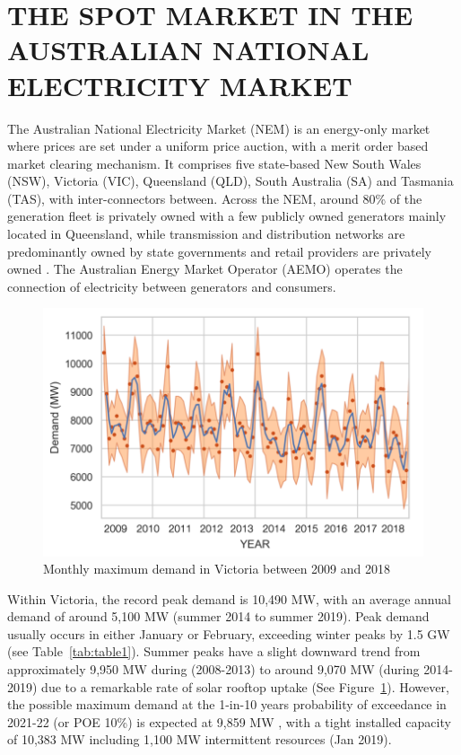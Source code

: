 \documentclass{pasa}%
\begin{document}
\section{THE SPOT MARKET IN THE AUSTRALIAN NATIONAL ELECTRICITY MARKET}
\label{sec:NEM}

The Australian National Electricity Market (NEM) is an energy-only market where prices are set under a uniform price auction, with a merit order based market clearing mechanism. It comprises five state-based New South Wales (NSW), Victoria (VIC), Queensland (QLD), South Australia (SA) and Tasmania (TAS), with inter-connectors between. Across the NEM, around 80\% of the generation fleet is privately owned with a few publicly owned generators mainly located in Queensland, while transmission and distribution networks are predominantly owned by state governments and retail providers are privately owned \cite{aer2019}. The Australian Energy Market Operator (AEMO) operates the connection of electricity between generators and consumers. 

\begin{figure}
\begin{center}
\includegraphics[width=.7\textwidth,height=.23\textheight,keepaspectratio]{DR/PASA_example/Figures_DR/vicmaxdemand.png}
\caption{Monthly maximum demand in Victoria between 2009 and 2018}\label{fig:Fig1-vicmaxdemand}
\end{center}
\end{figure}

Within Victoria, the record peak demand is 10,490 MW, with an average annual demand of around 5,100 MW (summer 2014 to summer 2019). Peak demand usually occurs in either January or February, exceeding winter peaks by 1.5 GW (see Table~\ref{tab:table1}). Summer peaks have a slight downward trend from approximately 9,950 MW during (2008-2013) to around 9,070 MW (during 2014-2019) due to a remarkable rate of solar rooftop uptake (See Figure~\ref{fig:Fig1-vicmaxdemand}). However, the possible maximum demand at the 1-in-10 years probability of exceedance in 2021-22 (or POE 10\%) is expected at 9,859 MW \cite{aemo2018}, with a tight installed capacity of 10,383 MW including 1,100 MW intermittent resources (Jan 2019).
\end{document}
